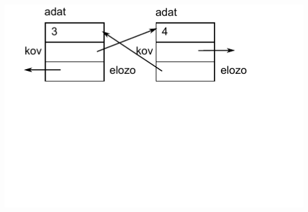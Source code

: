 \begin{frame}
  \begin{center}
    \includegraphics[scale=0.55]{lista2/list2-15.pdf}
  \end{center}
  \vspace{-.4cm}
  \scriptsize
  \begin{exampleblock}{}
    \tiny
    \vspace{-.2cm}
    
    \vspace{-.2cm}
  \end{exampleblock}
\end{frame}